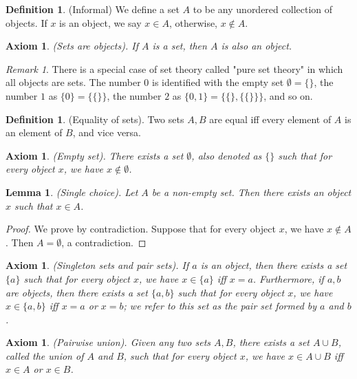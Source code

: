 \documentclass[12pt]{article}
\newtheorem{lemma}[theorem]{Lemma}
\newtheorem{axiom}[theorem]{Axiom}
\theoremstyle{definition}
\newtheorem{definition}[theorem]{Definition}
\theoremstyle{remark}
\newtheorem*{remark}{Remark}
\begin{document}
\begin{definition}
    (Informal) We define a set $A$ to be any unordered collection of objects. If $x$ is an object, we say $x \in A$, otherwise, $x \not\in A$.
\end{definition}

\begin{axiom}
    (Sets are objects). If $A$ is a set, then $A$ is also an object.
\end{axiom}

\begin{remark}
    There is a special case of set theory called "pure set theory" in which all objects are sets. The number $0$ is identified with the empty set $\emptyset = \{\}$, the number $1$ as $\{0\} = \{\{\}\}$, the number $2$ as $\{0, 1\} = \{\{\}, \{\{\}\}\}$, and so on.
\end{remark}

\begin{definition}
    (Equality of sets). Two sets $A, B$ are equal iff every element of $A$ is an element of $B$, and vice versa.
\end{definition}

\begin{axiom}
    (Empty set). There exists a set $\emptyset$, also denoted as $\{\}$ such that for every object $x$, we have $x \not\in \emptyset$.
\end{axiom}

\begin{lemma}
    (Single choice). Let $A$ be a non-empty set. Then there exists an object $x$ such that $x \in A$.
\end{lemma}

\begin{proof}
    We prove by contradiction. Suppose that for every object $x$, we have $x \not\in A$. Then $A = \emptyset$, a contradiction.
\end{proof}

\begin{axiom}
    (Singleton sets and pair sets). If $a$ is an object, then there exists a set $\{a\}$ such that for every object $x$, we have $x \in \{a\}$ iff $x = a$. Furthermore, if $a, b$ are objects, then there exists a set $\{a, b\}$ such that for every object $x$, we have $x \in \{a, b\}$ iff $x = a$ or $x = b$; we refer to this set as the pair set formed by $a$ and $b$.
\end{axiom}

\begin{axiom}
    (Pairwise union). Given any two sets $A, B$, there exists a set $A \cup B$, called the union of $A$ and $B$, such that for every object $x$, we have $x \in A \cup B$ iff $x \in A$ or $x \in B$.
\end{axiom}
\end{document}
